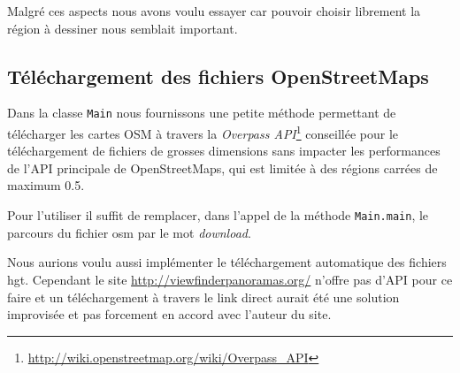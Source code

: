 \documentclass[11pt,a4paper]{article}
\begin{document}
Malgré ces aspects nous avons voulu essayer car pouvoir choisir librement la région à dessiner nous semblait important.

\subsection{Téléchargement des fichiers OpenStreetMaps}
Dans la classe \texttt{Main} nous fournissons une petite méthode permettant de télécharger les cartes OSM à travers la \textit{Overpass API}\footnote{\url{http://wiki.openstreetmap.org/wiki/Overpass_API}} conseillée pour le téléchargement de fichiers de grosses dimensions sans impacter les performances de l'API principale de OpenStreetMaps, qui est limitée à des régions carrées de maximum 0.5\degre.

Pour l'utiliser il suffit de remplacer, dans l'appel de la méthode \texttt{Main.main}, le parcours du fichier osm par le mot \textit{download}.

Nous aurions voulu aussi implémenter le téléchargement automatique des fichiers hgt. Cependant le site \url{http://viewfinderpanoramas.org/} n'offre pas d'API pour ce faire et un téléchargement à travers le link direct aurait été une solution improvisée et pas forcement en accord avec l'auteur du site.
\end{document}

